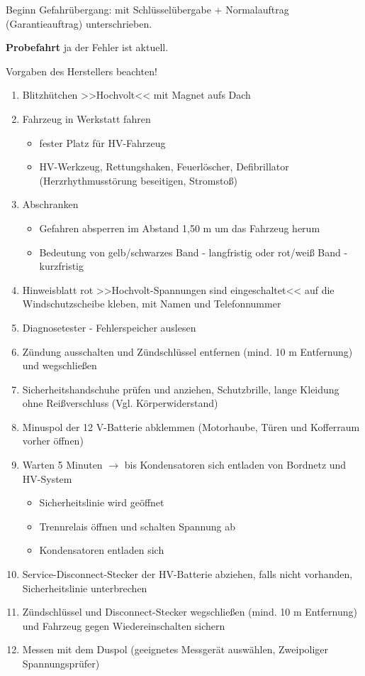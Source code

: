 Beginn Gefahrübergang: mit Schlüsselübergabe + Normalauftrag
(Garantieauftrag) unterschrieben.

\textbf{Probefahrt} ja der Fehler ist aktuell.

Vorgaben des Herstellers beachten!

\begin{enumerate}
\item
  Blitzhütchen >>Hochvolt<< mit Magnet aufs Dach
\item
  Fahrzeug in Werkstatt fahren

  \begin{itemize}
  \item
    fester Platz für HV-Fahrzeug
  \item
    HV-Werkzeug, Rettungshaken, Feuerlöscher, Defibrillator
    (Herzrhythmusstörung beseitigen, Stromstoß)
  \end{itemize}
\item
  Abschranken

  \begin{itemize}
  \item
    Gefahren absperren im Abstand 1,50 m um das Fahrzeug herum
  \item
    Bedeutung von gelb/schwarzes Band - langfristig oder rot/weiß Band -
    kurzfristig
  \end{itemize}
\item
  Hinweisblatt rot >>Hochvolt-Spannungen sind eingeschaltet<< auf die
  Windschutzscheibe kleben, mit Namen und Telefonnummer
\item
  Diagnosetester - Fehlerspeicher auslesen
\item
  Zündung ausschalten und Zündschlüssel entfernen (mind. 10 m
  Entfernung) und wegschließen
\item
  Sicherheitshandschuhe prüfen und anziehen, Schutzbrille, lange
  Kleidung ohne Reißverschluss (Vgl. Körperwiderstand)
\item
  Minuspol der 12 V-Batterie abklemmen (Motorhaube, Türen und Kofferraum
  vorher öffnen)
\item
  Warten 5 Minuten $\to$ bis Kondensatoren sich entladen von Bordnetz
  und HV-System

  \begin{itemize}
  \item
    Sicherheitslinie wird geöffnet
  \item
    Trennrelais öffnen und schalten Spannung ab
  \item
    Kondensatoren entladen sich
  \end{itemize}
\item
  Service-Disconnect-Stecker der HV-Batterie abziehen, falls nicht
  vorhanden, Sicherheitslinie unterbrechen
\item
  Zündschlüssel und Disconnect-Stecker wegschließen (mind. 10 m
  Entfernung) und Fahrzeug gegen Wiedereinschalten sichern
\item
  Messen mit dem Duspol (geeignetes Messgerät auswählen, Zweipoliger
  Spannungsprüfer)


\end{enumerate}
